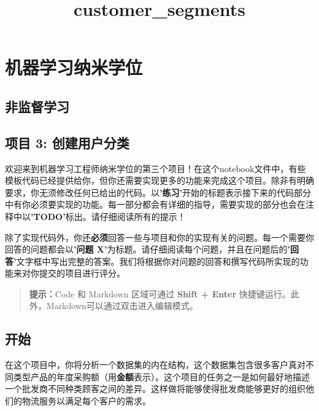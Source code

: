 \documentclass[11pt]{article}
\title{customer\_segments}
\begin{document}
    
    
    \maketitle
    
    

    
    \section{机器学习纳米学位}\label{ux673aux5668ux5b66ux4e60ux7eb3ux7c73ux5b66ux4f4d}

\subsection{非监督学习}\label{ux975eux76d1ux7763ux5b66ux4e60}

\subsection{项目 3:
创建用户分类}\label{ux9879ux76ee-3-ux521bux5efaux7528ux6237ux5206ux7c7b}

    欢迎来到机器学习工程师纳米学位的第三个项目！在这个notebook文件中，有些模板代码已经提供给你，但你还需要实现更多的功能来完成这个项目。除非有明确要求，你无须修改任何已给出的代码。以\textbf{'练习'}开始的标题表示接下来的代码部分中有你必须要实现的功能。每一部分都会有详细的指导，需要实现的部分也会在注释中以\textbf{'TODO'}标出。请仔细阅读所有的提示！

除了实现代码外，你还\textbf{必须}回答一些与项目和你的实现有关的问题。每一个需要你回答的问题都会以\textbf{'问题
X'}为标题。请仔细阅读每个问题，并且在问题后的\textbf{'回答'}文字框中写出完整的答案。我们将根据你对问题的回答和撰写代码所实现的功能来对你提交的项目进行评分。

\begin{quote}
\textbf{提示：}Code 和 Markdown 区域可通过 \textbf{Shift + Enter}
快捷键运行。此外，Markdown可以通过双击进入编辑模式。
\end{quote}

    \subsection{开始}\label{ux5f00ux59cb}

在这个项目中，你将分析一个数据集的内在结构，这个数据集包含很多客户真对不同类型产品的年度采购额（用\textbf{金额}表示）。这个项目的任务之一是如何最好地描述一个批发商不同种类顾客之间的差异。这样做将能够使得批发商能够更好的组织他们的物流服务以满足每个客户的需求。
\end{document}
